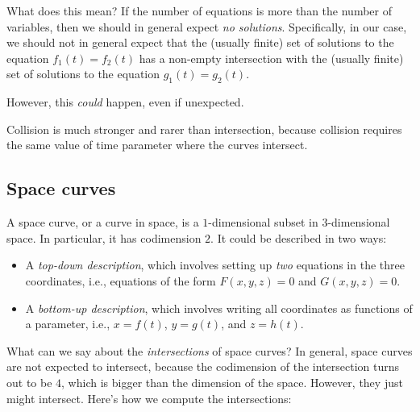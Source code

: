 \documentclass[10pt]{amsart}
\begin{document}
What does this mean? If the number of equations is more than the
number of variables, then we should in general expect {\em no
solutions}. Specifically, in our case, we should not in general expect
that the (usually finite) set of solutions to the equation $f_1(t) =
f_2(t)$ has a non-empty intersection with the (usually finite) set of
solutions to the equation $g_1(t) = g_2(t)$.

However, this {\em could} happen, even if unexpected.

Collision is much stronger and rarer than intersection, because
collision requires the same value of time parameter where the curves
intersect.

\subsection{Space curves}

A space curve, or a curve in space, is a $1$-dimensional subset in
$3$-dimensional space. In particular, it has codimension $2$. It could
be described in two ways:

\begin{itemize}
\item A {\em top-down description}, which involves setting up {\em
  two} equations in the three coordinates, i.e., equations of the form
  $F(x,y,z) = 0$ and $G(x,y,z) = 0$.
\item A {\em bottom-up description}, which involves writing all
  coordinates as functions of a parameter, i.e., $x = f(t)$, $y =
  g(t)$, and $z = h(t)$.
\end{itemize}

What can we say about the {\em intersections} of space curves? In
general, space curves are not expected to intersect, because the
codimension of the intersection turns out to be $4$, which is bigger
than the dimension of the space. However, they just might
intersect. Here's how we compute the intersections:
\end{document}
